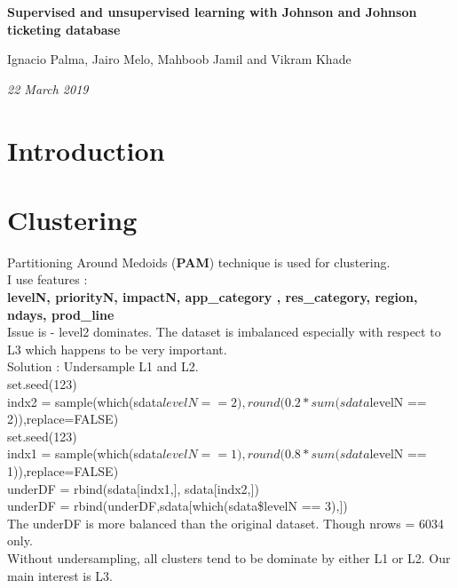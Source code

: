 \documentclass{article}
\begin{document}
\begin{center}
{\Huge{\textbf{Supervised and unsupervised learning with Johnson and Johnson ticketing database}}}
\vspace{0.5cm}

\Large{Ignacio Palma,  Jairo Melo, Mahboob Jamil and Vikram Khade}
\vspace{0.2cm}

\emph{22 March 2019}
\end{center}

\section{Introduction}


\section{Clustering}
Partitioning Around Medoids (\textbf{PAM})  technique is used for clustering.\\

I use features :\\

\textbf{levelN,   priorityN,   impactN,  app\_category ,  res\_category,  region, ndays, prod\_line}\\

Issue is - level2 dominates. The dataset is imbalanced especially with respect to L3 which happens to be very important.\\

Solution : Undersample L1 and L2.\\

set.seed(123)\\
indx2 = sample(which(sdata$levelN == 2), round(0.2*sum(sdata$levelN == 2)),replace=FALSE)\\
set.seed(123)\\
indx1 = sample(which(sdata$levelN == 1), round(0.8*sum(sdata$levelN == 1)),replace=FALSE)\\

underDF = rbind(sdata[indx1,], sdata[indx2,])\\
underDF = rbind(underDF,sdata[which(sdata\$levelN == 3),])\\

The underDF is more balanced than the original dataset. Though nrows = 6034 only.\\

Without undersampling, all clusters tend to be dominate by either L1 or L2. Our main interest is L3.\\
\end{document}
